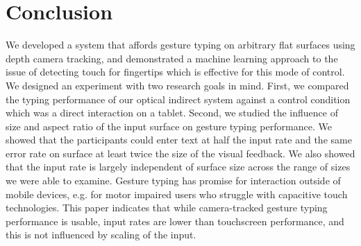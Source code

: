 \documentclass{chi-ext}
\begin{document}
\section{Conclusion}
We developed a system that affords gesture typing on arbitrary flat surfaces using depth camera tracking, and demonstrated a machine learning approach to the issue of detecting touch for fingertips which is effective for this mode of control. We designed an experiment with two research goals in mind. First, we compared the typing performance of our optical indirect system against a control condition which was a direct interaction on a tablet. Second, we studied the influence of size and aspect ratio of the input surface on gesture typing performance. We showed that the participants could enter text at half the input rate and the same error rate on surface at least twice the size of the visual feedback. We also showed that the input rate is largely independent of surface size across the range of sizes we were able to examine. Gesture typing has promise for interaction outside of mobile devices, e.g. for motor impaired users who struggle with capacitive touch technologies. This paper indicates that while camera-tracked gesture typing performance is usable, input rates are lower than touchscreen performance, and this is not influenced by scaling of the input.




\balance


\end{document}
